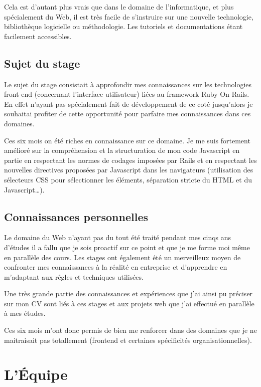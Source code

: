 \documentclass[12pt,a4paper]{book}
\begin{document}
Cela est d'autant plus vrais que dans le domaine de l'informatique, et plus spécialement du Web, il est très facile de s'instruire sur une nouvelle technologie, bibliothèque logicielle ou méthodologie. Les tutoriels et documentations étant facilement accessibles.

\subsection{Sujet du stage}

Le sujet du stage consistait à approfondir mes connaissances sur les technologies front-end (concernant l'interface utilisateur) liées au framework Ruby On Rails. En effet n'ayant pas spécialement fait de développement de ce coté jusqu'alors je souhaitai profiter de cette opportunité pour parfaire mes connaissances dans ces domaines.

Ces six mois on été riches en connaissance sur ce domaine. Je me suis fortement amélioré sur la compréhension et la structuration de mon code Javascript en partie en respectant les normes de codages imposées par Rails et en respectant les nouvelles directives proposées par Javascript dans les navigateurs (utilisation des sélecteurs CSS pour sélectionner les éléments, séparation stricte du HTML et du Javascript…).

\subsection{Connaissances personnelles}

Le domaine du Web n'ayant pas du tout été traité pendant mes cinqs ans d'études il a fallu que je sois proactif sur ce point et que je me forme moi même en parallèle des cours. Les stages ont également été un merveilleux moyen de confronter mes connaissances à la réalité en entreprise et d'apprendre en m'adaptant aux rêgles et techniques utilisées.

Une très grande partie des connaissances et expériences que j'ai ainsi pu préciser sur mon CV sont liés à ces stages et aux projets web que j'ai effectué en parallèle à mes études.

Ces six mois m'ont donc permis de bien me renforcer dans des domaines que je ne maitraisait pas totallement (frontend et certaines spécificités organisationnelles).

\section{L'Équipe}
\end{document}
